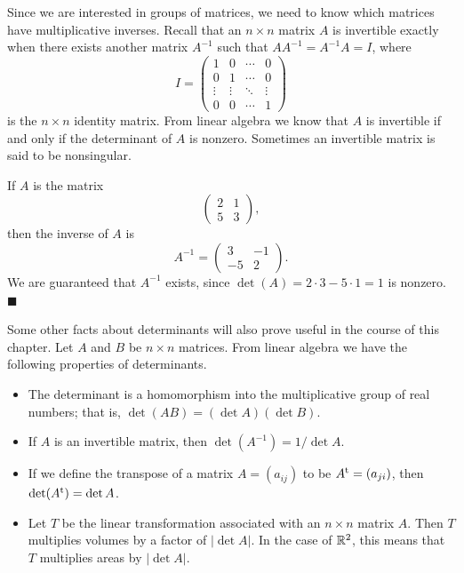  
Since we are interested in groups of matrices, we need to know
which matrices have multiplicative inverses. Recall that an $n \times
n$ matrix $A$ is {\bfi invertible\/} exactly
when there exists another matrix $A^{-1}$ such that $A A^{-1} = A^{-1}
A = I$, where 
\[
I =
\left(
\begin{array}{cccc}
1 & 0 & \cdots & 0 \\
0 & 1 & \cdots & 0 \\
\vdots & \vdots & \ddots & \vdots \\
0 & 0 & \cdots & 1
\end{array}
\right)
\]
is the $n \times n$ identity matrix. From linear algebra we know that
$A$ is invertible if and only if the determinant of $A$ is nonzero.
Sometimes an invertible matrix is said to be {\bfi
nonsingular}. 
 
 
\vspace{1.5ex}
 
 
If $A$ is the matrix
\[
\left(
\begin{array}{cc}
2 & 1 \\
5 & 3
\end{array}
\right),
\]
then the inverse of $A$ is
\[
A^{-1} =
\left(
\begin{array}{cc}
3 & -1 \\
-5 & 2
\end{array}
\right).
\]
We are guaranteed  that $A^{-1}$ exists, since $\det(A) = 2 \cdot 3 - 5
\cdot 1 = 1$ is nonzero. \mbox{\hspace*{1in}}
\hspace{\fill} $\blacksquare$
 
 
\vspace{1.5ex}
 
 
Some other facts about determinants will also prove useful in the
course of this chapter.   Let $A$ and $B$ be $n \times n$ matrices.
From linear algebra we have the following properties of determinants.
\begin{itemize}
 
\item
The determinant is a homomorphism into the multiplicative group of
real numbers; that is, $\det( A B) = (\det A )(\det B)$. 
 
\item
If $A$ is an invertible matrix, then $\det(A^{-1}) = 1 / \det A$.
 
\item
If we define the transpose  of a matrix $A = (a_{ij})$ to be $A^{\rm
t} = (a_{ji})$, then $\det(A^{\rm t}) = \det A$. 
 
\item
Let $T$ be the linear transformation associated with an $n \times n$
matrix $A$. Then $T$ multiplies volumes by a factor of $|\det A|$. In
the case of ${\Bbb R}^2$, this means that $T$ multiplies areas by
$|\det A|$.
 
\end{itemize}
 
